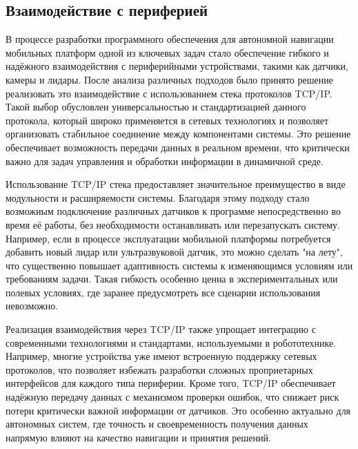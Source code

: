 

\subsection{Взаимодействие с периферией}


В процессе разработки программного обеспечения для автономной навигации
мобильных платформ одной из ключевых задач стало обеспечение гибкого и надёжного
взаимодействия с периферийными устройствами, такими как датчики, камеры и
лидары. После анализа различных подходов было принято решение реализовать это
взаимодействие с использованием стека протоколов TCP/IP. Такой выбор обусловлен
универсальностью и стандартизацией данного протокола, который широко применяется
в сетевых технологиях и позволяет организовать стабильное соединение между
компонентами системы. Это решение обеспечивает возможность передачи данных в
реальном времени, что критически важно для задач управления и обработки
информации в динамичной среде.

Использование TCP/IP стека предоставляет значительное преимущество в виде
модульности и расширяемости системы. Благодаря этому подходу стало возможным
подключение различных датчиков к программе непосредственно во время её работы,
без необходимости останавливать или перезапускать систему. Например, если в
процессе эксплуатации мобильной платформы потребуется добавить новый лидар или
ультразвуковой датчик, это можно сделать "на лету", что существенно повышает
адаптивность системы к изменяющимся условиям или требованиям задачи. Такая
гибкость особенно ценна в экспериментальных или полевых условиях, где заранее
предусмотреть все сценарии использования невозможно.

Реализация взаимодействия через TCP/IP также упрощает интеграцию с современными
технологиями и стандартами, используемыми в робототехнике. Например, многие
устройства уже имеют встроенную поддержку сетевых протоколов, что позволяет
избежать разработки сложных проприетарных интерфейсов для каждого типа
периферии. Кроме того, TCP/IP обеспечивает надёжную передачу данных с механизмом
проверки ошибок, что снижает риск потери критически важной информации от
датчиков. Это особенно актуально для автономных систем, где точность и
своевременность получения данных напрямую влияют на качество навигации и
принятия решений.

